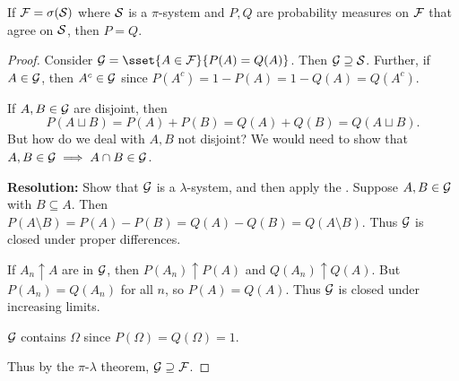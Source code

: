 \begin{theorem} \label{thm:unique}
    If $\mathcal F = \sigma(\mathcal{S})$ where $\mathcal{S}$ is a $\pi$-system and
    $P, Q$ are probability measures on $\mathcal F$ that agree on $\mathcal{S}$,
    then $P = Q$.
\end{theorem}
\begin{proof}
    Consider $\mcG = \sset{A \in \F}{P(A) = Q(A)}$.
    Then $\mathcal{G} \supseteq \mathcal{S}$.
    Further, if $A \in \mathcal{G}$, then $A^c \in \mathcal{G}$
    since $P(A^c) = 1 - P(A) = 1 - Q(A) = Q(A^c)$.

    If $A, B \in \mathcal{G}$ are disjoint, then \[
        P(A \sqcup B) = P(A) + P(B) = Q(A) + Q(B) = Q(A \sqcup B).
    \] But how do we deal with $A, B$ not disjoint?
    We would need to show that $A, B \in \mathcal{G} \implies A \cap B \in \mathcal{G}$.

    \textbf{Resolution:} Show that $\mathcal{G}$ is a $\lambda$-system,
    and then apply the .
    Suppose $A, B \in \mathcal{G}$ with $B \subseteq A$.
    Then $P(A \setminus B) = P(A) - P(B) = Q(A) - Q(B) = Q(A \setminus B)$.
    Thus $\mathcal{G}$ is closed under proper differences.

    If $A_n \uparrow A$ are in $\mathcal{G}$, then $P(A_n) \uparrow P(A)$ and
    $Q(A_n) \uparrow Q(A)$.
    But $P(A_n) = Q(A_n)$ for all $n$, so $P(A) = Q(A)$.
    Thus $\mathcal{G}$ is closed under increasing limits.

    $\mathcal{G}$ contains $\Omega$ since $P(\Omega) = Q(\Omega) = 1$.

    Thus by the $\pi$-$\lambda$ theorem, $\mathcal{G} \supseteq \mathcal F$.
\end{proof}

